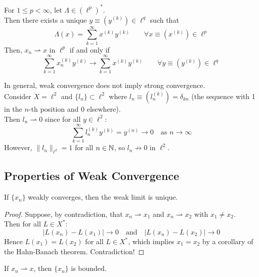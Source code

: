 \begin{theorem}
For $1 \leq p < \infty$, let $\Lambda \in (\ell^p)^*$.\\
Then there exists a unique $y \equiv (y^{(k)}) \in \ell^q$ such that
\[
\Lambda(x) = \sum_{k=1}^{\infty} x^{(k)} y^{(k)} \quad \quad\forall x \equiv (x^{(k)}) \in \ell^p
\]
Then, $x_n \rightharpoonup x$ in $\ell^p$ if and only if
\[
\sum_{k=1}^{\infty} x_n^{(k)} y^{(k)} \to \sum_{k=1}^{\infty} x^{(k)} y^{(k)} \quad\quad \forall y \equiv (y^{(k)}) \in \ell^q
\]
\end{theorem}

\begin{remark}
In general, weak convergence does not imply strong convergence. \\
Consider $X = \ell^2$ and $\{l_n\} \subset \ell^2$ where $l_n \equiv (l_n^{(k)}) = \delta_{kn}$ (the sequence with 1 in the $n$-th position and 0 elsewhere). \\
Then $l_n \rightharpoonup 0$ since for all $y \in \ell^2$:
\[
\sum_{k=1}^{\infty} l_n^{(k)} y^{(k)} = y^{(n)} \to 0 \quad \text{as } n \to \infty
\]
However, $\|l_n\|_{\ell^2} = 1$ for all $n \in \mathbb{N}$, so $l_n \not\to 0$ in $\ell^2$.
\end{remark}

\subsection{Properties of Weak Convergence}

\begin{theorem}
If $\{x_n\}$ weakly converges, then the weak limit is unique.
\end{theorem}

\begin{proof}
Suppose, by contradiction, that $x_n \rightharpoonup x_1$ and $x_n \rightharpoonup x_2$ with $x_1 \neq x_2$. \\
Then for all $L \in X^*$:
\[
|L(x_n) - L(x_1)| \to 0 \quad \text{and} \quad |L(x_n) - L(x_2)| \to 0
\]
Hence $L(x_1) = L(x_2)$ for all $L \in X^*$, which implies $x_1 = x_2$ by a corollary of the Hahn-Banach theorem. Contradiction!
\end{proof}

\begin{proposition}
If $x_n \rightharpoonup x$, then $\{x_n\}$ is bounded.
\end{proposition}

